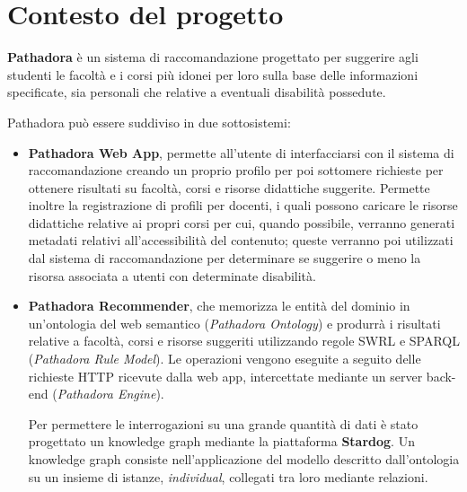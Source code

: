 \clearpage{\pagestyle{empty}\cleardoublepage}
\chapter{Contesto del progetto}
\textbf{Pathadora} è un sistema di raccomandazione progettato per suggerire agli studenti le facoltà e i corsi più idonei per loro sulla base delle informazioni specificate, sia personali che relative a eventuali disabilità possedute. 

Pathadora può essere suddiviso in due sottosistemi: 
\begin{itemize}
\item \textbf{Pathadora Web App}, permette all'utente di interfacciarsi con il sistema di raccomandazione creando un proprio profilo per poi sottomere richieste per ottenere risultati su facoltà, corsi e risorse didattiche suggerite. Permette inoltre la registrazione di profili per docenti, i quali possono caricare le risorse didattiche relative ai propri corsi per cui, quando possibile, verranno generati metadati relativi all'accessibilità del contenuto; queste verranno poi utilizzati dal sistema di raccomandazione per determinare se suggerire o meno la risorsa associata a utenti con determinate disabilità.
\item \textbf{Pathadora Recommender}, che memorizza le entità del dominio in un'ontologia del web semantico (\textit{Pathadora Ontology}) e produrrà i risultati relative a facoltà, corsi e risorse suggeriti utilizzando regole SWRL e SPARQL (\textit{Pathadora Rule Model}). Le operazioni vengono eseguite a seguito delle richieste HTTP ricevute dalla web app, intercettate mediante un server back-end (\textit{Pathadora Engine}).

Per permettere le interrogazioni su una grande quantità di dati è stato progettato un knowledge graph mediante la piattaforma \textbf{Stardog}. Un knowledge graph consiste nell'applicazione del modello descritto dall'ontologia su un insieme di istanze, \textit{individual}, collegati tra loro mediante relazioni.
\end{itemize}

